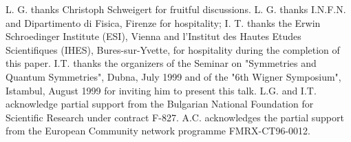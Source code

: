 \documentclass[a4paper,12pt]{article}
\begin{document}
L. G. thanks Christoph Schweigert for fruitful discussions.
L. G. thanks I.N.F.N. and Dipartimento di Fisica, Firenze for hospitality;
I. T. thanks the Erwin Schroedinger Institute (ESI), Vienna and l'Institut des
Hautes Etudes Scientifiques (IHES), Bures-sur-Yvette, for hospitality
during the completion of this paper.
I.T. thanks the organizers of the
Seminar on "Symmetries and Quantum Symmetries", Dubna, July 1999 and of
the "6th Wigner Symposium", Istambul, August 1999 for inviting him to
present this talk.
L.G. and I.T. acknowledge partial support from the Bulgarian
National Foundation for Scientific Research under contract F-827.
A.C. acknowledges the partial support from the European
Community network programme FMRX-CT96-0012.
\def\NP{{\it Nucl. Phys.\ }}
\def\PRL{{\it Phys. Rev. Lett.\ }}
\def\PL{{\it Phys. Lett.\ }}
\def\PR{{\it Phys. Rev.\ }}
\def\CMP{{\it Comm. Math. Phys.\ }}
\def\IJMP{{\it Int. J. Mod. Phys.\ }}
\def\JSP{{\it J. Stat. Phys.\ }}
\def\JP{{\it J. Phys.\ }}
\end{document}
